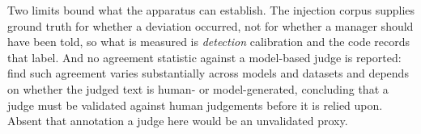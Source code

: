 Two limits bound what the apparatus can establish. The injection corpus supplies ground truth for
whether a deviation occurred, not for whether a manager should have been told, so what is measured
is \emph{detection} calibration and the code records that label. And no agreement statistic
against a model-based judge is reported: \citet{bavaresco_llms_2025} find such agreement varies
substantially across models and datasets and depends on whether the judged text is human- or
model-generated, concluding that a judge must be validated against human judgements before it is
relied upon. Absent that annotation a judge here would be an unvalidated proxy.
